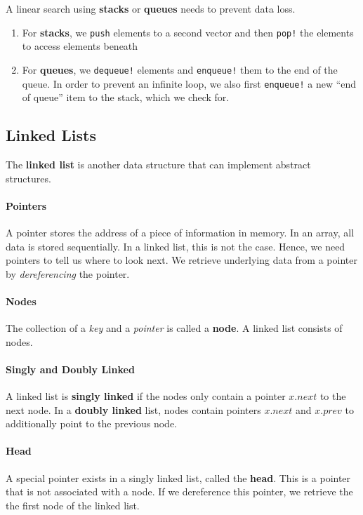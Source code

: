 A linear search using \textbf{stacks} or \textbf{queues} needs to prevent data loss.

\begin{enumerate}
	\item For \textbf{stacks}, we \texttt{push} elements to a second vector and then \texttt{pop!} the elements to access elements beneath
	\item For \textbf{queues}, we \texttt{dequeue!} elements and \texttt{enqueue!} them to the end of the queue. In order to prevent an infinite loop, we also first \texttt{enqueue!} a new ``end of queue'' item to the stack, which we check for.  
\end{enumerate}

\subsection{Linked Lists}
The \textbf{linked list} is another data structure that can implement abstract structures.
\paragraph{Pointers} A pointer stores the address of a piece of information in memory. In an array, all data is stored sequentially. In a linked list, this is not the case. Hence, we need pointers to tell us where to look next. We retrieve underlying data from a pointer by \emph{dereferencing} the pointer. 

\paragraph{Nodes} The collection of a \emph{key} and a \emph{pointer} is called a \textbf{node}. A linked list consists of nodes.  

\paragraph{Singly and Doubly Linked} A linked list is \textbf{singly linked} if the nodes only contain a pointer \( x.next \)  to the next node. In a \textbf{doubly linked} list, nodes contain pointers \( x.next \) and \( x.prev \) to additionally point to the previous node.

\paragraph{Head} A special pointer exists in a singly linked list, called the \textbf{head}. This is a pointer that is not associated with a node. If we dereference this pointer, we retrieve the the first node of the linked list.


